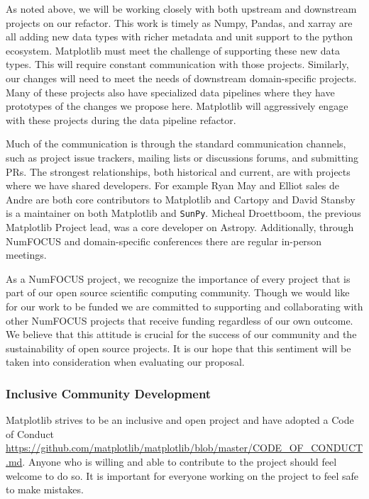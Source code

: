 \documentclass[12pt]{article}
\numberwithin{page}{section}
\begin{document}
As noted above, we will be working closely with both upstream and downstream projects on our refactor.  This work is timely as Numpy, Pandas, and xarray are all adding new data types with richer metadata and unit support to the python ecosystem.  Matplotlib must meet the challenge of supporting these new data types.    This will require constant communication with those projects.  Similarly, our changes will need to meet the needs of downstream domain-specific projects.  Many of these projects also have specialized data pipelines where they have prototypes of the changes we propose here.  Matplotlib will aggressively engage with these projects during the data pipeline refactor.

Much of the communication is through the standard communication
channels, such as project issue trackers, mailing lists or discussions
forums, and submitting PRs.  The strongest relationships, both
historical and current, are with projects where we have shared
developers.  For example Ryan May and Elliot sales de Andre are both
core contributors to Matplotlib and Cartopy and David Stansby is a
maintainer on both Matplotlib and \texttt{SunPy}.  Micheal Droettboom,
the previous Matplotlib Project lead, was a core developer on Astropy.
Additionally, through NumFOCUS and domain-specific conferences there
are regular in-person meetings.


As a NumFOCUS project, we recognize the importance of every project
that is part of our open source scientific computing community. Though
we would like for our work to be funded we are committed to supporting
and collaborating with other NumFOCUS projects that receive funding
regardless of our own outcome. We believe that this attitude is
crucial for the success of our community and the sustainability of
open source projects. It is our hope that this sentiment will be taken
into consideration when evaluating our proposal.


\subsubsection{Inclusive Community Development}

Matplotlib strives to be an inclusive and open project and have
adopted a Code of Conduct
\url{https://github.com/matplotlib/matplotlib/blob/master/CODE_OF_CONDUCT.md}.
Anyone who is willing and able to contribute to the project should feel
welcome to do so.  It is important for everyone working on the project
to feel safe to make mistakes.
\end{document}
